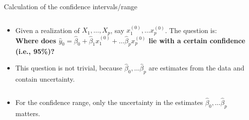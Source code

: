 \documentclass[10pt,ignorenonframetext,]{beamer}
\providecommand{\tightlist}{%
  \setlength{\itemsep}{0pt}\setlength{\parskip}{0pt}}
\begin{document}
\begin{frame}

\begin{block}{Calculation of the confidence intervals/range}

\(~\)

\begin{itemize}
\tightlist
\item
  Given a realization of \(X_1, \ldots ,X_p\), say
  \(x_1^{(0)}, \ldots x_p^{(0)}\). The question is:\\
  \vspace{2mm} \textbf{Where does
  \(\hat y_0 = \hat\beta_0 + \hat\beta_1 x_1^{(0)} + \ldots \hat\beta_p x_p^{(0)}\)
  lie with a certain confidence (i.e., 95\%)?}
\end{itemize}

\vspace{6mm}

\begin{itemize}
\tightlist
\item
  This question is not trivial, because
  \(\hat\beta_0, \ldots \hat\beta_p\) are estimates from the data and
  contain uncertainty.
\end{itemize}

\(~\)

\vspace{4mm}

\begin{itemize}
\tightlist
\item
  For the confidence range, only the uncertainty in the estimates
  \(\hat\beta_0, \ldots \hat\beta_p\) matters.
\end{itemize}

\end{block}

\end{frame}
\end{document}
